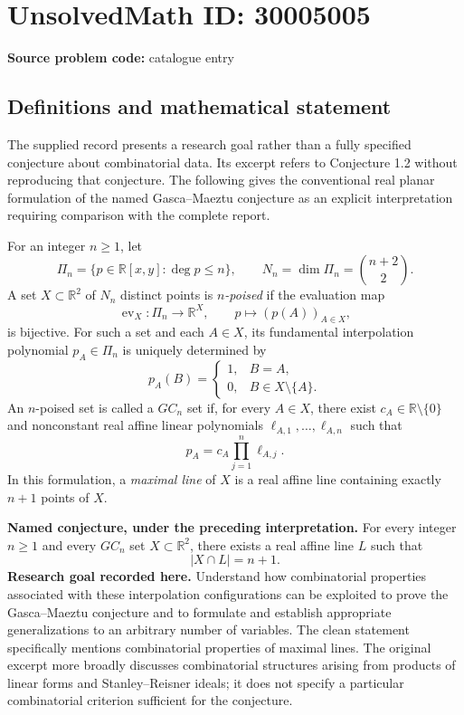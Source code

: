 \documentclass[11pt]{article}
\newcommand{\R}{\mathbb{R}}
\begin{document}
\section*{UnsolvedMath ID: 30005005}
\textbf{Source problem code:} catalogue entry
\subsection{Definitions and mathematical statement}
The supplied record presents a research goal rather than a fully specified conjecture about combinatorial data. Its excerpt refers to Conjecture 1.2 without reproducing that conjecture. The following gives the conventional real planar formulation of the named Gasca--Maeztu conjecture as an explicit interpretation requiring comparison with the complete report.

For an integer \(n\geq 1\), let
\[
\Pi_n=\{p\in\R[x,y]:\deg p\leq n\},\qquad N_n=\dim\Pi_n=\binom{n+2}{2}.
\]
A set \(X\subset\R^2\) of \(N_n\) distinct points is \emph{\(n\)-poised} if the evaluation map
\[
\operatorname{ev}_X:\Pi_n\longrightarrow\R^X,\qquad p\longmapsto (p(A))_{A\in X},
\]
is bijective. For such a set and each \(A\in X\), its fundamental interpolation polynomial \(p_A\in\Pi_n\) is uniquely determined by
\[
p_A(B)=\begin{cases}1,&B=A,\\0,&B\in X\setminus\{A\}.\end{cases}
\]
An \(n\)-poised set is called a \(GC_n\) set if, for every \(A\in X\), there exist \(c_A\in\R\setminus\{0\}\) and nonconstant real affine linear polynomials \(\ell_{A,1},\ldots,\ell_{A,n}\) such that
\[
p_A=c_A\prod_{j=1}^n\ell_{A,j}.
\]
In this formulation, a \emph{maximal line} of \(X\) is a real affine line containing exactly \(n+1\) points of \(X\).

\textbf{Named conjecture, under the preceding interpretation.} For every integer \(n\geq1\) and every \(GC_n\) set \(X\subset\R^2\), there exists a real affine line \(L\) such that
\[
|X\cap L|=n+1.
\]
\textbf{Research goal recorded here.} Understand how combinatorial properties associated with these interpolation configurations can be exploited to prove the Gasca--Maeztu conjecture and to formulate and establish appropriate generalizations to an arbitrary number of variables. The clean statement specifically mentions combinatorial properties of maximal lines. The original excerpt more broadly discusses combinatorial structures arising from products of linear forms and Stanley--Reisner ideals; it does not specify a particular combinatorial criterion sufficient for the conjecture.
\end{document}

